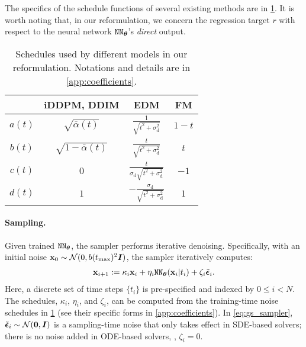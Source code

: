 The specifics of the schedule functions of several existing methods are in \cref{tab:coefficients_train}. It is worth noting that, in our reformulation, we concern the regression target $r$ with respect to the neural network ${\texttt{NN}}_{{\bm{\theta}}}$'s \textit{direct} output.\footnotemark





\begin{table}[t]
    \centering
    \caption{
 Schedules used by different models in our reformulation. Notations and details are in \cref{app:coefficients}.
 }
    \vspace{-.5em}
    \label{tab:coefficients_train}
    \scriptsize
    \begin{tabular}{c|ccc}
        \hline
        & \textbf{iDDPM, DDIM} & \textbf{EDM} & \textbf{FM} \\
        \hline
        $a(t)$ & $\sqrt{\bar{\alpha}(t)}$ & $\frac{1}{\sqrt{t^2+\sigma_\text{d}^2}}$ & $1-t$ \\
        $b(t)$ & $\sqrt{1{-}\bar{\alpha}(t)}$ & $\frac{t}{\sqrt{t^2+\sigma_\text{d}^2}}$ & $t$ \\
        $c(t)$ & $0$ & $\frac{t}{\sigma_\text{d}\sqrt{t^2+\sigma_\text{d}^2}}$ & $-1$ \\
        $d(t)$ & $1$ & $-\frac{\sigma_\text{d}}{\sqrt{t^2+\sigma_\text{d}^2}}$ & $1$ \\
        \hline
    \end{tabular}
\end{table}



\paragraph{Sampling.} Given trained ${\texttt{NN}}_{{\bm{\theta}}}$, the sampler performs iterative denoising. Specifically, with an initial noise ${\mathbf{x}}_0 \sim \mathcal{N}(0, b(t_{{\text{max}}})^2{\bm{I}})$, the sampler iteratively computes:
\begin{align}
    \label{eq:gs_sampler}
    {\mathbf{x}}_{i+1} := \kappa_i{\mathbf{x}}_i + \eta_i{\texttt{NN}}_{\bm{\theta}}({\mathbf{x}}_i|t_i) + \zeta_i\tilde{{\bm{\epsilon}}}_i.
\end{align}
Here, a discrete set of time steps $\{t_i\}$ is pre-specified and indexed by $0 \leq i < N$. The schedules, $\kappa_i$, $\eta_i$, and $\zeta_i$, can be computed from the training-time noise schedules in \cref{tab:coefficients_train} (see their specific forms in \cref{app:coefficients}).
In \cref{eq:gs_sampler},
$\tilde{{\bm{\epsilon}}}_i\sim \mathcal{N}(\bm 0,{\bm{I}})$ is a sampling-time noise that only takes effect in SDE-based solvers; there is no noise added in ODE-based solvers, \ie, $\zeta_i=0$.

